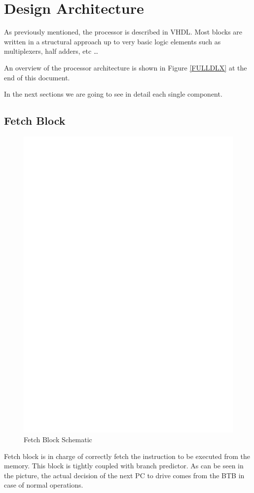\documentclass[12pt]{article}
\begin{document}
\section{Design Architecture}\label{Design}
As previously mentioned, the processor is described in VHDL. Most blocks are written in a structural approach up to very basic logic elements such as multiplexers, half adders, etc \ldots

An overview of the processor architecture is shown in Figure \ref{FULLDLX} at the end of this document.

In the next sections we are going to see in detail each single component.

\subsection{Fetch Block}
\begin{figure}[h!]
	\includegraphics[width=\textwidth, center]{images/FETCH_BLOCK.eps}
	\caption{Fetch Block Schematic}
	\label{FETCHBLOCK}
\end{figure}
Fetch block is in charge of correctly fetch the instruction to be executed from the memory. This block is tightly coupled with branch predictor. As can be seen in the picture, the actual decision of the next PC to drive comes from the BTB in case of normal operations.
\end{document}
